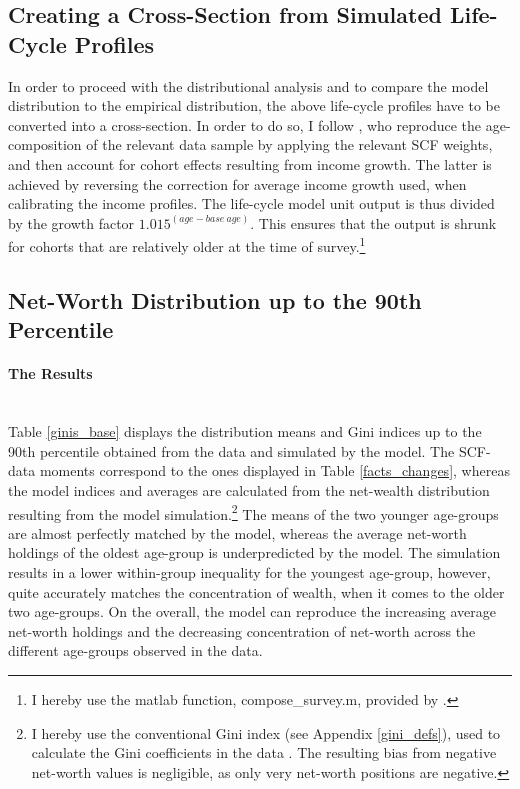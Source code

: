 \documentclass[a4paper,12pt,legno]{article}
\newcommand{\myparagraph}[1]{\paragraph{#1}\mbox{}\\}
\begin{document}
\subsection{Creating a Cross-Section from Simulated Life-Cycle Profiles}
In order to proceed with the distributional analysis and to compare the model distribution to the empirical distribution, the above life-cycle profiles have to be converted into a cross-section. In order to do so, I follow \cite{hintermaier2011}, who reproduce the age-composition of the relevant data sample by applying the relevant SCF weights, and then account for cohort effects resulting from income growth. The latter is achieved by reversing the correction for average income growth used, when calibrating the income profiles. The life-cycle model unit output is thus divided by the growth factor $1.015^{(age-base\ age)}$. This ensures that the output is shrunk for cohorts that are relatively older at the time of survey.\footnote{I hereby use the matlab function, compose\_survey.m, provided by \cite{hintermaier2016}.}

\subsection{Net-Worth Distribution up to the 90th Percentile}

\myparagraph{The Results}
Table \ref{ginis_base} displays the distribution means and Gini indices up to the 90th percentile obtained from the data and simulated by the model. The SCF-data moments correspond to the ones displayed in Table \ref{facts_changes}, whereas the model indices and averages are calculated from the net-wealth distribution resulting from the model simulation.\footnote{I hereby use the conventional Gini index (see Appendix \ref{gini_defs}), used to calculate the Gini coefficients in the data . The resulting bias from negative net-worth values \citep{chen1982} is negligible, as only very net-worth positions are negative.} The means of the two younger age-groups are almost perfectly matched by the model, whereas the average net-worth holdings of the oldest age-group is underpredicted by the model. The simulation results in a lower within-group inequality for the youngest age-group, however, quite accurately matches the concentration of wealth, when it comes to the older two age-groups. On the overall, the model can reproduce the increasing average net-worth holdings and the decreasing concentration of net-worth across the different age-groups observed in the data. 
\end{document}

